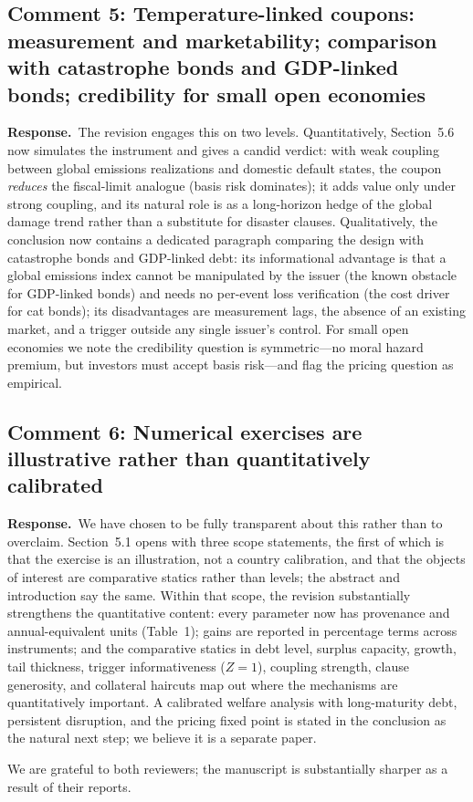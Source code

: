 \documentclass[11pt]{article}
\newcommand{\response}{\par\noindent\textbf{Response.}\ }
\begin{document}
\subsection*{Comment 5: Temperature-linked coupons: measurement and marketability; comparison with catastrophe bonds and GDP-linked bonds; credibility for small open economies}

\response The revision engages this on two levels. Quantitatively, Section~5.6 now simulates the instrument and gives a candid verdict: with weak coupling between global emissions realizations and domestic default states, the coupon \emph{reduces} the fiscal-limit analogue (basis risk dominates); it adds value only under strong coupling, and its natural role is as a long-horizon hedge of the global damage trend rather than a substitute for disaster clauses. Qualitatively, the conclusion now contains a dedicated paragraph comparing the design with catastrophe bonds and GDP-linked debt: its informational advantage is that a global emissions index cannot be manipulated by the issuer (the known obstacle for GDP-linked bonds) and needs no per-event loss verification (the cost driver for cat bonds); its disadvantages are measurement lags, the absence of an existing market, and a trigger outside any single issuer's control. For small open economies we note the credibility question is symmetric---no moral hazard premium, but investors must accept basis risk---and flag the pricing question as empirical.

\subsection*{Comment 6: Numerical exercises are illustrative rather than quantitatively calibrated}

\response We have chosen to be fully transparent about this rather than to overclaim. Section~5.1 opens with three scope statements, the first of which is that the exercise is an illustration, not a country calibration, and that the objects of interest are comparative statics rather than levels; the abstract and introduction say the same. Within that scope, the revision substantially strengthens the quantitative content: every parameter now has provenance and annual-equivalent units (Table~1); gains are reported in percentage terms across instruments; and the comparative statics in debt level, surplus capacity, growth, tail thickness, trigger informativeness ($Z=1$), coupling strength, clause generosity, and collateral haircuts map out where the mechanisms are quantitatively important. A calibrated welfare analysis with long-maturity debt, persistent disruption, and the pricing fixed point is stated in the conclusion as the natural next step; we believe it is a separate paper.

\bigskip
We are grateful to both reviewers; the manuscript is substantially sharper as a result of their reports.
\end{document}
